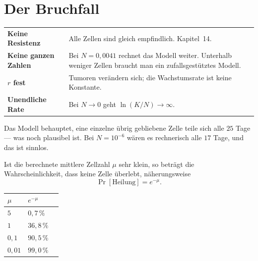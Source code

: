 \section{Der Bruchfall}

\begin{warnung}
\begin{center}
{\small
\renewcommand{\arraystretch}{1.5}
\begin{tabular}{@{}P{2.4cm}P{6.2cm}@{}}
\toprule
\textbf{Keine Resistenz} & Alle Zellen sind gleich empfindlich. Kapitel~14.\\
\textbf{Keine ganzen Zahlen} & Bei $N = 0{,}0041$ rechnet das Modell weiter. Unterhalb weniger Zellen braucht man ein zufallsgestütztes Modell.\\
\textbf{$r$ fest} & Tumoren verändern sich; die Wachstumsrate ist keine Konstante.\\
\textbf{Unendliche Rate} & Bei $N \to 0$ geht $\ln(K/N) \to \infty$.\\
\bottomrule
\end{tabular}}
\end{center}

Das Modell behauptet, eine einzelne übrig gebliebene Zelle teile sich alle $25$ Tage --- was noch plausibel ist. Bei $N = 10^{-6}$ wären es rechnerisch alle $17$ Tage, und das ist sinnlos.

\begin{center}
\begin{minipage}{0.88\textwidth}
\end{minipage}
\end{center}

Ist die berechnete mittlere Zellzahl $\mu$ sehr klein, so beträgt die Wahrscheinlichkeit, dass keine Zelle überlebt, näherungsweise
\[ \Pr[\text{Heilung}] = e^{-\mu} . \]

\begin{center}
\renewcommand{\arraystretch}{1.45}
\begin{tabular}{@{}P{2.0cm}P{2.6cm}P{2.4cm}@{}}
\toprule
$\mu$ & $e^{-\mu}$ & \\
\midrule
$5$ & $0{,}7\,\%$ & \\
$1$ & $36{,}8\,\%$ & \\
$0{,}1$ & $90{,}5\,\%$ & \\
$0{,}01$ & $99{,}0\,\%$ & \\
\bottomrule
\end{tabular}
\end{center}


\end{warnung}

